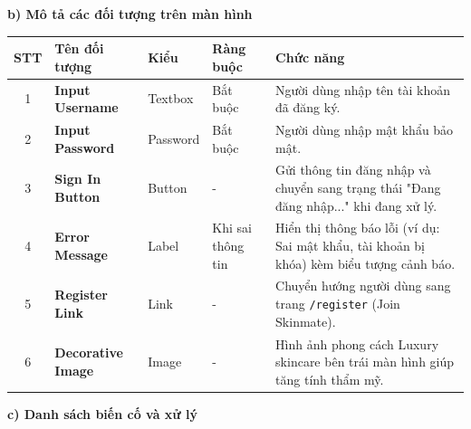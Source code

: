\documentclass[12pt,a4paper]{article}
\begin{document}
\textbf{b) Mô tả các đối tượng trên màn hình}

\begin{center}
\renewcommand{\arraystretch}{1.5}
\begin{tabularx}{\textwidth}{|c|l|l|l|X|}
\hline
\rowcolor{blue!20}
\textbf{STT} & \textbf{Tên đối tượng} & \textbf{Kiểu} & \textbf{Ràng buộc} & \textbf{Chức năng} \\ \hline

1 & \textbf{Input Username} & Textbox & Bắt buộc & Người dùng nhập tên tài khoản đã đăng ký. \\ \hline

2 & \textbf{Input Password} & Password & Bắt buộc & Người dùng nhập mật khẩu bảo mật. \\ \hline

3 & \textbf{Sign In Button} & Button & - & Gửi thông tin đăng nhập và chuyển sang trạng thái "Đang đăng nhập..." khi đang xử lý. \\ \hline

4 & \textbf{Error Message} & Label & Khi sai thông tin & Hiển thị thông báo lỗi (ví dụ: Sai mật khẩu, tài khoản bị khóa) kèm biểu tượng cảnh báo. \\ \hline

5 & \textbf{Register Link} & Link & - & Chuyển hướng người dùng sang trang \texttt{/register} (Join Skinmate). \\ \hline

6 & \textbf{Decorative Image} & Image & - & Hình ảnh phong cách Luxury skincare bên trái màn hình giúp tăng tính thẩm mỹ. \\ \hline

\end{tabularx}
\end{center}

\textbf{c) Danh sách biến cố và xử lý}
\end{document}
